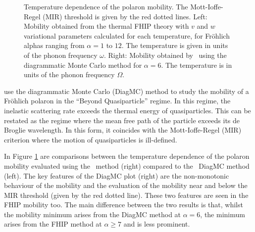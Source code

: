 \begin{figure}[t]
{\begin{subfigure}[b]{.6\textwidth}
\end{subfigure}%
}
\caption{Temperature dependence of the polaron mobility. The Mott-Ioffe-Regel (MIR) threshold is given by the red dotted lines. Left: Mobility obtained from the thermal FHIP theory with $v$ and $w$ variational parameters calculated for each temperature, for Fr\"ohlich alphas ranging from $\alpha = 1$ to  $12$. The temperature is given in units of the phonon frequency $\omega$. Right: Mobility obtained by~\cite{mishchenko_polaron_2019} using the diagrammatic Monte Carlo method for $\alpha = 6$. The temperature is in units of the phonon frequency $\Omega$.}
\label{fig:mishchenko2}
\end{figure}

\cite{mishchenko_polaron_2019} use the diagrammatic Monte Carlo (DiagMC) method to study the mobility of a Fr\"ohlich polaron in the ``Beyond Quasiparticle'' regime. In this regime, the inelastic scattering rate exceeds the thermal energy of quasiparticles. This can be restated as the regime where the mean free path of the particle exceeds its de Broglie wavelength. In this form, it coincides with the Mott-Ioffe-Regel (MIR) criterion where the motion of quasiparticles is ill-defined. 

In Figure \ref{fig:mishchenko2} are comparisons between the temperature dependence of the polaron mobility evaluated using the~\cite{feynman_mobility_1962} method (right) compared to the~\cite{mishchenko_polaron_2019} DiagMC method (left). The key features of the DiagMC plot (right) are the non-monotonic behaviour of the mobility and the evaluation of the mobility near and below the MIR threshold (given by the red dotted line). These two features are seen in the FHIP mobility too. The main difference between the two results is that, whilst the mobility minimum arises from the DiagMC method at $\alpha = 6$, the minimum arises from the FHIP method at $\alpha \geq 7$ and is less prominent. 

